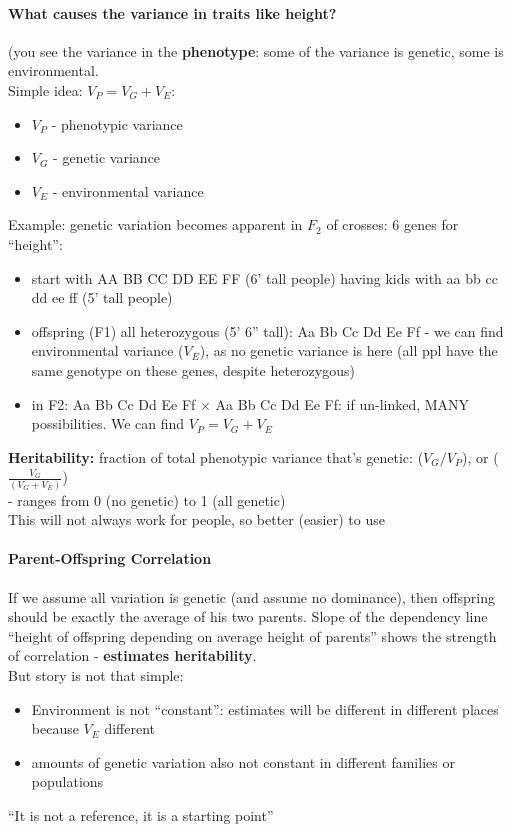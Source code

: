 \documentclass{scrartcl}
\begin{document}
\paragraph{What causes the variance in traits like height?}
(you see the variance in the {\bf phenotype}: some of the variance is genetic, some is environmental.\\
Simple idea: $V_P = V_G + V_E$:
\begin{itemize}
\item $V_P$ - phenotypic variance
\item $V_G$ - genetic variance
\item $V_E$ - environmental variance
\end{itemize}
Example: genetic variation becomes apparent in $F_2$ of crosses: 6 genes for ``height'':
\begin{itemize}
\item start with AA BB CC DD EE FF (6' tall people) having kids with aa bb cc dd ee ff (5' tall people)
\item offspring (F1) all heterozygous (5' 6'' tall): Aa Bb Cc Dd Ee Ff - we can find environmental variance ($V_E$), as no genetic variance is here (all ppl have the same genotype on these genes, despite heterozygous)
\item in F2: Aa Bb Cc Dd Ee Ff $\times$ Aa Bb Cc Dd Ee Ff: if un-linked, MANY possibilities.
We can find $V_P = V_G + V_E$
\end{itemize}
{\bf Heritability:} fraction of total phenotypic variance that's genetic: ($V_G/V_P$), or ($\frac{V_G}{(V_G + V_E)}$)\\
- ranges from 0 (no genetic) to 1 (all genetic)\\
This will not always work for people, so better (easier) to use 

\paragraph{Parent-Offspring Correlation}
If we assume all variation is genetic (and assume no dominance), then offspring should be exactly the average of his two parents.
Slope of the dependency line ``height of offspring depending on average height of parents'' shows the strength of correlation - {\bf estimates heritability}.\\
But story is not that simple:
\begin{itemize}
\item Environment is not ``constant'': estimates will be different in different places because $V_E$ different
\item amounts of genetic variation also not constant in different families or populations
\end{itemize}
``It is not a reference, it is a starting point''
\end{document}
